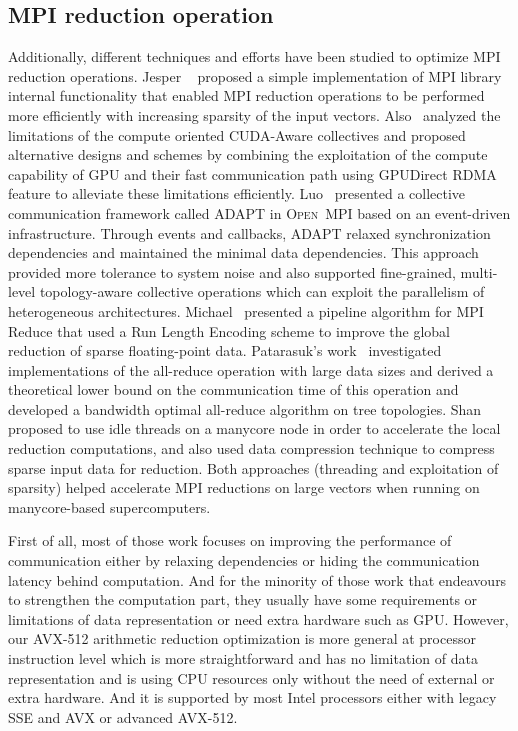 \documentclass[sigconf]{acmart}
\newcommand{\ompi}[0]{\textsc{Open~MPI}\xspace}
\newcommand{\mpi}[0]{\textsc{MPI}\xspace}
\begin{document}
\subsection{\mpi reduction operation}
Additionally, different techniques and
efforts have been studied to optimize \mpi reduction operations. Jesper
~\cite{Neutral_MPI_Reduction} proposed a simple implementation of MPI library
internal functionality that enabled MPI reduction operations to be performed
more efficiently with increasing sparsity of the input vectors.
%
Also~\cite{gpu-reduce} analyzed the limitations of the compute oriented CUDA-Aware
collectives and proposed alternative designs and schemes by combining the exploitation of the
compute capability of GPU and their fast communication
path using GPUDirect RDMA feature to alleviate these limitations efficiently.
%
Luo~\cite{Luo-adapt} presented a collective communication framework called ADAPT
in \ompi based on an event-driven infrastructure. Through events and callbacks,
ADAPT relaxed synchronization dependencies and maintained the minimal data dependencies.
This approach provided more tolerance to system noise and also supported fine-grained,
multi-level topology-aware collective operations which can exploit the
parallelism of heterogeneous architectures.
%
Michael~\cite{sparse-reduction} presented a pipeline algorithm for MPI Reduce
that used a Run Length Encoding scheme to improve the global reduction of sparse
floating-point data.
Patarasuk's work~\cite{all-reduce09} investigated implementations of the all-reduce operation
with large data sizes and derived a theoretical lower bound on the communication time of this operation and developed
a bandwidth optimal all-reduce algorithm on tree topologies.
%
Shan~\cite{shan-reduce} proposed to use idle threads on a manycore node in order to accelerate
the local reduction computations, and also used data compression technique to compress sparse input data for reduction.
Both approaches (threading and exploitation
of sparsity) helped accelerate MPI reductions on large vectors when
running on manycore-based supercomputers.
%

First of all, most of those work focuses on improving the performance of
communication either by relaxing dependencies or hiding the communication latency behind computation.
And for the minority of those work that endeavours to strengthen the computation part,
they usually have some requirements or limitations of data
representation or need extra hardware such as GPU.
However, our AVX-512 arithmetic reduction
optimization is more general at processor instruction level which is more
straightforward and has no limitation of data representation and is using CPU resources only
without the need of external or extra hardware.
And it is supported by most Intel processors either with legacy SSE and AVX or advanced AVX-512.
\end{document}
